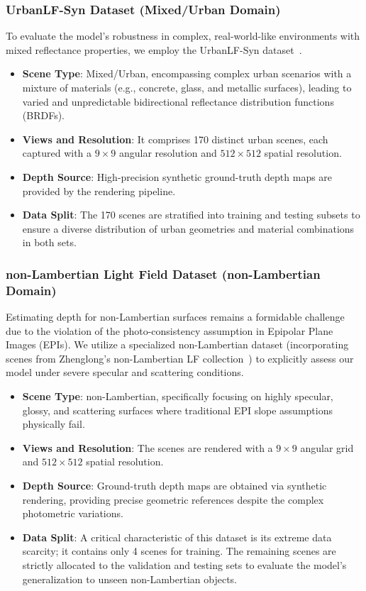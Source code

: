 \documentclass[lettersize,journal]{IEEEtran}
\begin{document}
\subsubsection{UrbanLF-Syn Dataset (Mixed/Urban Domain)}
To evaluate the model's robustness in complex, real-world-like environments with mixed reflectance properties, we employ the UrbanLF-Syn dataset~\cite{honauer2016}.
\begin{itemize}
\item \textbf{Scene Type}: Mixed/Urban, encompassing complex urban scenarios with a mixture of materials (e.g., concrete, glass, and metallic surfaces), leading to varied and unpredictable bidirectional reflectance distribution functions (BRDFs).
\item \textbf{Views and Resolution}: It comprises 170 distinct urban scenes, each captured with a $9 \times 9$ angular resolution and $512 \times 512$ spatial resolution.
\item \textbf{Depth Source}: High-precision synthetic ground-truth depth maps are provided by the rendering pipeline.
\item \textbf{Data Split}: The 170 scenes are stratified into training and testing subsets to ensure a diverse distribution of urban geometries and material combinations in both sets.
\end{itemize}

\subsubsection{non-Lambertian Light Field Dataset (non-Lambertian Domain)}
Estimating depth for non-Lambertian surfaces remains a formidable challenge due to the violation of the photo-consistency assumption in Epipolar Plane Images (EPIs). We utilize a specialized non-Lambertian dataset (incorporating scenes from Zhenglong's non-Lambertian LF collection~\cite{drmcolo}) to explicitly assess our model under severe specular and scattering conditions.
\begin{itemize}
\item \textbf{Scene Type}: non-Lambertian, specifically focusing on highly specular, glossy, and scattering surfaces where traditional EPI slope assumptions physically fail.
\item \textbf{Views and Resolution}: The scenes are rendered with a $9 \times 9$ angular grid and $512 \times 512$ spatial resolution.
\item \textbf{Depth Source}: Ground-truth depth maps are obtained via synthetic rendering, providing precise geometric references despite the complex photometric variations.
\item \textbf{Data Split}: A critical characteristic of this dataset is its extreme data scarcity; it contains only 4 scenes for training. The remaining scenes are strictly allocated to the validation and testing sets to evaluate the model's generalization to unseen non-Lambertian objects.
\end{itemize}
\end{document}
